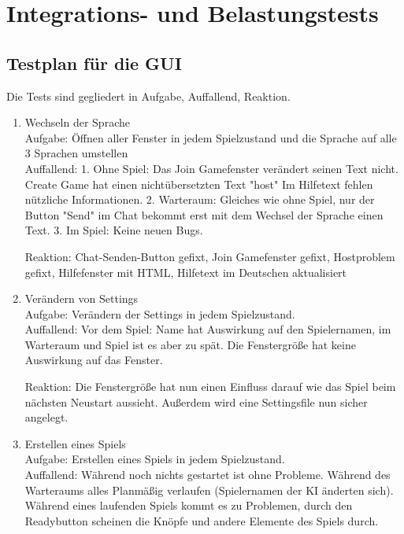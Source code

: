 \documentclass[a4paper,10pt]{article}
\begin{document}
\section{Integrations- und Belastungstests}
\subsection{Testplan für die GUI}

Die Tests sind gegliedert in Aufgabe, Auffallend, Reaktion.
\begin{enumerate}
\item Wechseln der Sprache \\
Aufgabe: Öffnen aller Fenster in jedem Spielzustand und die Sprache auf alle 3 Sprachen umstellen\\

Auffallend:
1. Ohne Spiel: Das Join Gamefenster verändert seinen Text nicht. Create Game hat einen nichtübersetzten Text "host" Im Hilfetext fehlen nützliche Informationen.
2. Warteraum: Gleiches wie ohne Spiel, nur der Button "Send" im Chat bekommt erst mit dem Wechsel der Sprache einen Text.
3. Im Spiel: Keine neuen Bugs.

Reaktion:
Chat-Senden-Button gefixt, Join Gamefenster gefixt, Hostproblem gefixt, Hilfefenster mit HTML, Hilfetext im Deutschen aktualisiert

\item Verändern von Settings \\
Aufgabe: Verändern der Settings in jedem Spielzustand.\\

Auffallend: Vor dem Spiel: Name hat Auswirkung auf den Spielernamen, im Warteraum und Spiel ist es aber zu spät. Die Fenstergröße hat keine Auswirkung auf das Fenster.

Reaktion: Die Fenstergröße hat nun einen Einfluss darauf wie das Spiel beim nächsten Neustart aussieht. Außerdem wird eine Settingsfile nun sicher angelegt.

\item Erstellen eines Spiels \\
Aufgabe: Erstellen eines Spiels in jedem Spielzustand.\\

Auffallend: Während noch nichts gestartet ist ohne Probleme. Während des Warteraums alles Planmäßig verlaufen (Spielernamen der KI änderten sich). Während eines laufenden Spiels kommt es zu Problemen, durch den Readybutton scheinen die Knöpfe und andere Elemente des Spiels durch.


\end{enumerate}
\end{document}

